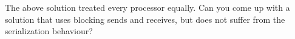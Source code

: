   The above solution treated every processor equally. Can you come up
  with a solution that uses blocking sends and receives, but does not
  suffer from the serialization behaviour?
